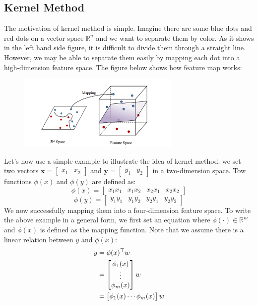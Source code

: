 \subsection{Kernel Method}
The motivation of kernel method is simple. Imagine there are some blue dots and red dots on a vector space $\mathbb{R}^n$ and 
we want to separate them by color. As it shows in the left hand side figure, it is difficult to divide them through a straight 
line. However, we may be able to separate them easily by mapping each dot into a high-dimension feature space. The figure below 
shows how feature map works:
\begin{figure}[H]
    \centering
    \includegraphics[width=0.7\textwidth]{Mapping}
\end{figure}
Let's now use a simple example to illustrate the idea of kernel method. 
we set two vectors $\textbf{x}=\begin{bmatrix}x_1&x_2\end{bmatrix}$ and $\textbf{y}=\begin{bmatrix}y_1&y_2\end{bmatrix}$ in a two-dimension space.
Tow functions $\phi(x)$ and $\phi(y)$ are defined as:
\begin{equation*}
    \phi(x)=\begin{bmatrix}
        x_1x_1&x_1x_2&x_2x_1&x_2x_2
    \end{bmatrix}
\end{equation*}
\begin{equation*}
    \phi(y)=\begin{bmatrix}
        y_1y_1&y_1y_2&y_2y_1&y_2y_2
    \end{bmatrix}
\end{equation*}
We now successfully mapping them into a four-dimension feature space. 
To write the above example in a general form, we first set an equation where $\phi(\cdot)\in\mathbb{R}^m$ and $\phi(x)$ is defined as the mapping function. Note that we assume there is a linear relation between $y$ and $\phi(x)$:
\begin{align}
    y&=\phi(x)^\top w \notag\\
     &= \begin{bmatrix}
        \phi_1(x) \\
        \vdots \\
        \phi_m(x)
        \end{bmatrix} w \notag\\
     &= \begin{bmatrix}
        \phi_1(x)\cdots\phi_m(x)
        \end{bmatrix} w
\end{align}
